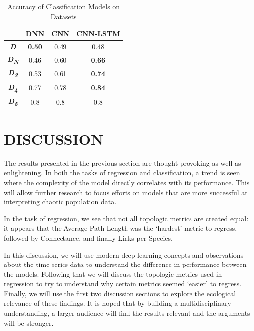 \documentclass[letterpaper, 10 pt, conference]{ieeeconf}  %
\begin{document}
\begin{table}
\caption{Accuracy of Classification Models on Datasets}
\setlength{\tabcolsep}{5mm} %
\def\arraystretch{1.25} %
\centering

  \begin{tabular}{|c|c|c|c|}
	\hline
    & \textbf{DNN} & \textbf{CNN} & \textbf{CNN-LSTM} \\ \hline
    \textbf{\textit{D}} & \textbf{0.50} & 0.49 & 0.48 \\ \hline
    \textbf{\textit{D\textsubscript{N}}} & 0.46 & 0.60 & \textbf{0.66} \\ \hline
    \textbf{\textit{D\textsubscript{3}}} & 0.53 & 0.61 & \textbf{0.74} \\ \hline
    \textbf{\textit{D\textsubscript{4}}} & 0.77 & 0.78 & \textbf{0.84}\\ \hline
    \textbf{\textit{D\textsubscript{5}}} & 0.8 & 0.8 & 0.8 \\ \hline
  \end{tabular}
\end{table}

\section{DISCUSSION}
	
    The results presented in the previous section are thought provoking as well as enlightening. In both the tasks of regression and classification, a trend is seen where the complexity of the model directly correlates with its performance. This will allow further research to focus efforts on models that are more successful at interpreting chaotic population data. 

    In the task of regression, we see that not all topologic metrics are created equal: it appears that the Average Path Length was the ‘hardest’ metric to regress, followed by Connectance, and finally Links per Species.
    
    In this discussion, we will use modern deep learning concepts and observations about the time series data to understand the difference in performance between the models. Following that we will discuss the topologic metrics used in regression to try to understand why certain metrics seemed ‘easier’ to regress. Finally, we will use the first two discussion sections to explore the ecological relevance of these findings. It is hoped that by building a multidisciplinary understanding, a larger audience will find the results relevant and the arguments will be stronger. 
\end{document}
